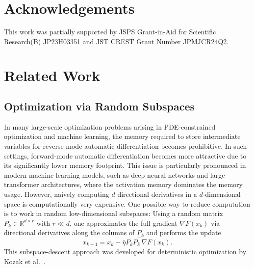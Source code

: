 \documentclass[10pt]{article}
\begin{document}
\section*{Acknowledgements}
This work was partially supported by JSPS Grant-in-Aid for Scientific Research(B) JP23H03351 and JST CREST Grant Number JPMJCR24Q2.



\onecolumn
\appendix


\section{Related Work}
\label{app:related-work}
\subsection{Optimization via Random Subspaces}
In many large-scale optimization problems arising in PDE-constrained optimization and machine learning, the memory required to store intermediate variables for reverse-mode automatic differentiation becomes prohibitive. 
In such settings, forward-mode automatic differentiation becomes more attractive due to its significantly lower memory footprint.
This issue is particularly pronounced in modern machine learning models, such as deep neural networks
and large transformer architectures, where the activation memory dominates the memory usage.
 However, naively computing $d$ directional derivatives in a $d$-dimensional space is computationally very expensive. 
One possible way to reduce computation is to work in random low-dimensional subspaces: Using  a random matrix $P_k \in \mathbb{R}^{d \times r}$ with $r \ll d$, one approximates the full gradient $\nabla F(x_k)$ via directional derivatives along the columns of $P_k$ and performs the update
\[
  x_{k+1} = x_k - \bar{\eta} P_k P_k^\top \nabla F(x_k).
\]
This subspace-descent approach was developed for deterministic optimization 
by Kozak et al.~\cite{kozak2021}.
\end{document}
